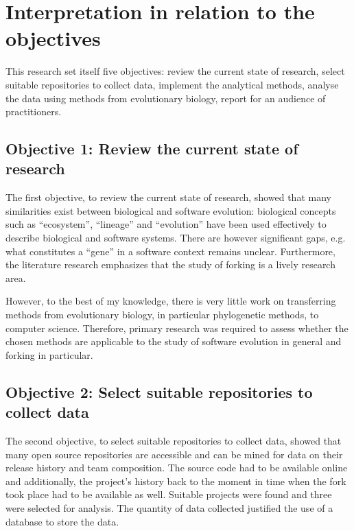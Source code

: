 
\section{Interpretation in relation to the objectives}
This research set itself five objectives: review the current state of research, select suitable repositories to collect data, implement the analytical methods, analyse the data using methods from evolutionary biology, report for an audience of practitioners.

\subsection{Objective 1: Review the current state of research}
The first objective, to review the current state of research, showed that many similarities exist between biological and software evolution: biological concepts such as “ecosystem”, “lineage” and “evolution” have been used effectively to describe biological and software systems. There are however significant gaps, e.g. what constitutes a “gene” in a software context remains unclear. Furthermore, the literature research emphasizes that the study of forking is a lively research area.

However, to the best of my knowledge, there is very little work on transferring methods from evolutionary biology, in particular phylogenetic methods, to computer science. Therefore, primary research was required to assess whether the chosen methods are applicable to the study of software evolution in general and forking in particular.

\subsection{Objective 2:  Select suitable repositories to collect data}
The second objective, to select suitable repositories to collect data, showed that many open source repositories are accessible and can be mined for data on their release history and team composition. The source code had to be available online and additionally, the project's history back to the moment in time when the fork took place had to be available as well. Suitable projects were found and three were selected for analysis. The quantity of data collected justified the use of a database to store the data.

